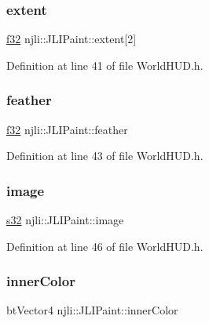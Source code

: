 \subsubsection{\texorpdfstring{extent}{extent}}
{\footnotesize\ttfamily \mbox{\hyperlink{_util_8h_a5f6906312a689f27d70e9d086649d3fd}{f32}} njli\+::\+J\+L\+I\+Paint\+::extent\mbox{[}2\mbox{]}}



Definition at line 41 of file World\+H\+U\+D.\+h.

\mbox{\label{structnjli_1_1_j_l_i_paint_a0ca1781af3e96711b8d93398942a83d1}} 
\subsubsection{\texorpdfstring{feather}{feather}}
{\footnotesize\ttfamily \mbox{\hyperlink{_util_8h_a5f6906312a689f27d70e9d086649d3fd}{f32}} njli\+::\+J\+L\+I\+Paint\+::feather}



Definition at line 43 of file World\+H\+U\+D.\+h.

\mbox{\label{structnjli_1_1_j_l_i_paint_a3f6e3a4e448803312e7506cf45b31e3f}} 
\subsubsection{\texorpdfstring{image}{image}}
{\footnotesize\ttfamily \mbox{\hyperlink{_util_8h_aa62c75d314a0d1f37f79c4b73b2292e2}{s32}} njli\+::\+J\+L\+I\+Paint\+::image}



Definition at line 46 of file World\+H\+U\+D.\+h.

\mbox{\label{structnjli_1_1_j_l_i_paint_a1d498a43bc3248a1ac16e5b5b1627a6a}} 
\subsubsection{\texorpdfstring{inner\+Color}{innerColor}}
{\footnotesize\ttfamily bt\+Vector4 njli\+::\+J\+L\+I\+Paint\+::inner\+Color}



